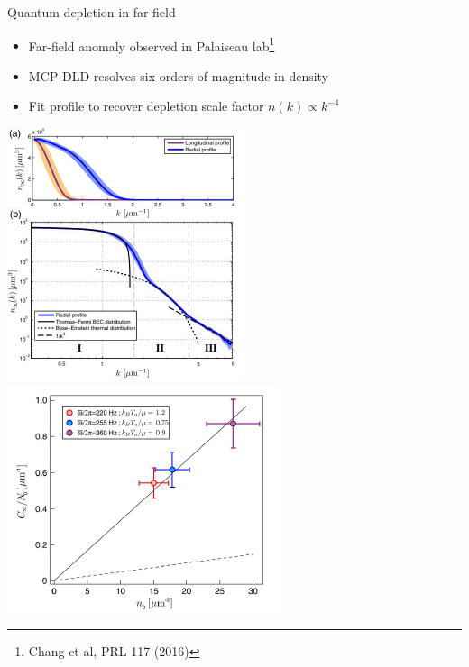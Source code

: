 \documentclass{beamer}
\begin{document}

\begin{frame}{Quantum depletion in far-field}
    \begin{itemize}
        \item Far-field anomaly observed in Palaiseau lab\footnote[frame]{Chang et al, PRL 117 (2016)}
        \item MCP-DLD resolves six orders of magnitude in density
        \item Fit profile to recover depletion scale factor $n(k)\propto k^{-4}$
    \end{itemize}
    \begin{center}
        \includegraphics[scale=0.6]{figures/QD/chang_profile.png} 
        \includegraphics[scale=0.6]{figures/QD/chang_results.png}    
    \end{center}
\end{frame}
\end{document}

